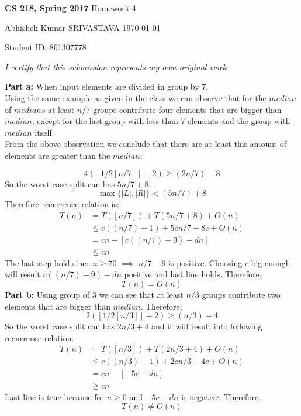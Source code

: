 \documentclass[a4paper,11pt]{article}
\renewcommand{\maketitle}{%
	
	\Large
 	\textbf{CS 218, Spring 2017}
 	\hfill
 	Homework 4
 	\par
 	
	\Large
	Abhishek Kumar SRIVASTAVA
	\hfill
	\normalsize
	\today
 	\par
 	Student ID: 861307778
 	\par
 	
 	\begin{center}

 	\vspace{.2in}
 	
 	\textit{I certify that this submission represents my own original work }
 	\par
	\vspace{.2in}
	\makebox[2.4in]{\hrulefill}
	\par

 	\end{center}
 	
 	\hrulefill
 	\par \vspace{2ex}
 	}
\theoremstyle{quest}
\newenvironment{solution}[2][Solution]{\begin{trivlist}
		\item[\hskip \labelsep {\bfseries #1}\hskip \labelsep {\bfseries #2.}]}{\end{trivlist}}
\begin{document}
\thispagestyle{empty}
	
\maketitle

\begin{solution}1	
	\textbf{Part a:} When input elements are divided in group by 7.\\
	
	Using the same example as given in the class we can observe that for the $median$ of $medians$ at least $n/7$ groups contribute four elements that are bigger than $median$, except for the last group with less than 7 elements and the group with $median$ itself.\\
	
	
	From the above observation we conclude that there are at least this amount of elements are greater than the $median$:
	
	\begin{equation*}
	4([1/2 [n/7]] - 2) \ge (2n/7) - 8
	\end{equation*}
	So the worst case split can has $5n/7 + 8$.
	\begin{equation*}
	\max\{|L|,|R|\} < (5n/7)+8
	\end{equation*}
	Therefore recurrence relation is:
	\begin{align*}
	T(n) &= T([n/7]) + T(5n/7 + 8) + O(n)\\
	&\le c((n/7)+1) + 5cn/7 + 8c + O(n)\\
	&= cn - [c((n/7)-9) - dn]\\
	&\le cn
	\end{align*}
	The last step hold since $n\ge70$ $\implies$ $n/7 - 9$ is positive. Choosing $c$ big enough will result $c((n/7)-9) - dn$ positive and last line holds. Therefore,
	\begin{equation*}
	\boxed{T(n) = O(n)}
	\end{equation*}
	\textbf{Part b:} Using group of 3  we can see that at least $n/3$ groups contribute two elements that are bigger than $median$. Therefore,
	\begin{equation*}
	2([1/2 [n/3]] - 2) \ge (n/3) - 4
	\end{equation*}
	 So the worst case split can has $2n/3 + 4$ and it will result into following recurrence relation.
	 \begin{align*}
	 T(n) &= T([n/3]) + T(2n/3 + 4) + O(n)\\
	 &\le c((n/3)+1) + 2cn/3 + 4c + O(n)\\
	 &= cn - [-5c -dn]\\
	 &\ge cn
	 \end{align*}
	 Last line is true because for $n\ge 0$ and $-5c -dn$ is negative. Therefore,
	 \begin{equation*}
	 \boxed{T(n) \ne O(n)}
	 \end{equation*}  
\end{solution}
\end{document}
